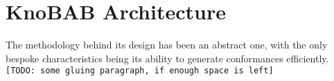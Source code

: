 \section{KnoBAB Architecture}
The methodology behind its design has been an abstract one, with the only bespoke characteristics being its ability to generate conformances efficiently. \texttt{\color{red}[TODO: some gluing paragraph, if enough space is left]}

